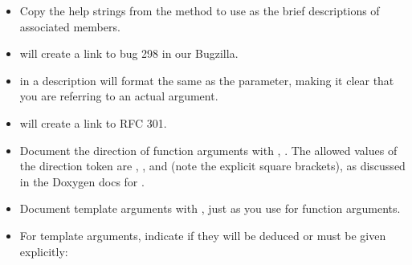 \documentclass[letterpaper,10pt,english]{sphinxmanual}
\renewcommand{\sphinxcode}[1]{\texttt{\small{#1}}}
\begin{document}
\begin{itemize}
\begin{sphinxVerbatim}[commandchars=\\\{\}]
     
\end{sphinxVerbatim}

\item {} 
Copy the \sphinxcode{} help strings from the \sphinxcode{} method to use
as the brief descriptions of associated members.

\item {} 
\sphinxcode{} will create a link to bug 298 in our Bugzilla.

\item {} 
\sphinxcode{} in a description will format \sphinxcode{}
the same as the \sphinxcode{} parameter, making it clear that you
are referring to an actual argument.

\item {} 
\sphinxcode{} will create a link to RFC 301.

\item {} 
Document the direction of function arguments with \sphinxcode{}, .
The allowed values of the direction token are \sphinxcode{\sphinxupquote{{[}in{]}}}, \sphinxcode{\sphinxupquote{{[}out{]}}}, and
\sphinxcode{\sphinxupquote{{[}in,out{]}}} (note the explicit square brackets), as discussed in the
Doxygen docs for \sphinxcode{}.

\item {} 
Document template arguments with \sphinxcode{}, just as you use \sphinxcode{}
for function arguments.

\item {} 
For template arguments, indicate if they will be deduced or must be given
explicitly:


\end{itemize}
\end{document}
